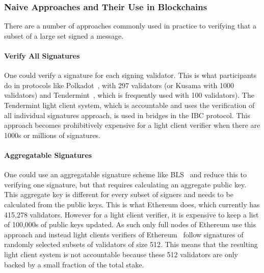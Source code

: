 \subsubsection{Naive Approaches and Their Use in Blockchains}
There are a number of approaches commonly used in practice to verifying that a subset of a large set signed a message. 
\vspace{-0.2cm}
\noindent \paragraph{Verify All Signatures}  One could verify a signature for each signing validator. This is what participants  do in protocols like Polkadot~\cite{polkadot}, with 297 validators
(or Kusama with 1000 validators) %
and Tendermint~\cite{tendermint_paper}, which is frequently used with 100 validators). %
The Tendermint light client system, which is accountable and uses the verification of all individual signatures approach, 
is used in bridges in the IBC protocol\cite{IBC_paper}. This approach becomes prohibitively expensive for a light client verifier when there are 1000s or millions of signatures. 
\vspace{-0.1in}
\noindent \paragraph{Aggregatable Signatures} One could use an aggregatable signature scheme like BLS~\cite{BLS_signatures,boneh_compact_multisig}  and reduce this to verifying one signature, but that requires calculating an aggregate public key. This aggregate key is different for every subset of signers and needs to be calculated from the public keys. This is what Ethereum 
does, which currently has 415,278 validators. %
However for a light client verifier, it is expensive to keep a list of 100,000s of public keys updated. As such only full nodes of Ethereum use this approach and instead light clients verifiers of Ethereum~\cite{sync_committee} follow signatures of randomly selected subsets of validators of size 512. This means that the resulting light client system is not accountable because these 512 validators are only backed by a small fraction of the total stake.
\vspace{-0.2cm}
